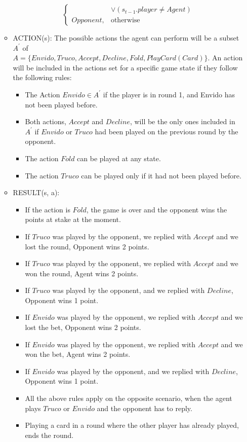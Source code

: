 \documentclass{article}
\begin{document}
\begin{enumerate}
\begin{itemize}
\[\begin{cases}
	& \lor (s_{t-1}.player \neq Agent)  \\
	Opponent,              & \text{otherwise}
	\end{cases}
	\]
	\item ACTION(s):
	The possible actions the agent can perform will be a subset $A^\prime$ of \\
	$A = \{Envido, Truco, Accept, Decline, Fold, PlayCard(Card) \}$. An action will be included in the actions set for a specific game state if they follow the following rules:
	\begin{itemize}
		\item The Action $Envido \in A^\prime$ if the player is in round 1, and Envido has not been played before.
		\item Both actions, $Accept$ and $Decline$, will be the only ones included in $A^\prime$ if $Envido$ or $Truco$ had been played on the previous round by the opponent.
		\item The action $Fold$ can be played at any state.
		\item The action $Truco$ can be played only if it had not been played before.
	\end{itemize}
	\item RESULT(s, a): 
	\begin{itemize}
		\item If the action is $Fold$, the game is over and the opponent wins the points at stake at the moment.
		\item If $Truco$ was played by the opponent, we replied with $Accept$ and we lost the round, Opponent wins 2 points.
		\item If $Truco$ was played by the opponent, we replied with $Accept$ and we won the round, Agent wins 2 points.
		\item If $Truco$ was played by the opponent, and we replied with $Decline$, Opponent wins 1 point.
		\item If $Envido$ was played by the opponent, we replied with $Accept$ and we lost the bet, Opponent wins 2 points.
		\item If $Envido$ was played by the opponent, we replied with $Accept$ and we won the bet, Agent wins 2 points.
		\item If $Envido$ was played by the opponent, and we replied with $Decline$, Opponent wins 1 point.
		\item All the above rules apply on the opposite scenario, when the agent plays $Truco$ or $Envido$ and the opponent has to reply.
		\item Playing a card in a round where the other player has already played, ends the round.

\end{itemize}
\end{itemize}
\end{enumerate}
\end{document}
